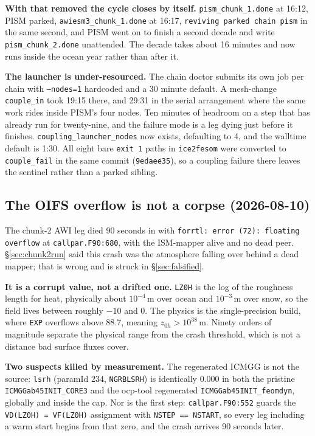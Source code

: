\documentclass[11pt,a4paper]{article}
\newcommand{\code}[1]{\texttt{\small #1}}
\begin{document}
\medskip\noindent
\textbf{With that removed the cycle closes by itself.} \code{pism\_chunk\_1.done} at 16:12, PISM
parked, \code{awiesm3\_chunk\_1.done} at 16:17, \code{reviving parked chain pism} in the same
second, and PISM went on to finish a second decade and write \code{pism\_chunk\_2.done} unattended.
The decade takes about 16 minutes and now runs inside the ocean year rather than after it.

\medskip\noindent
\textbf{The launcher is under-resourced.} The chain doctor submits its own job per chain with
\code{--nodes=1} hardcoded and a 30 minute default. A mesh-change \code{couple\_in} took 19:15
there, and 29:31 in the serial arrangement where the same work rides inside PISM's four nodes. Ten
minutes of headroom on a step that has already run for twenty-nine, and the failure mode is a leg
dying just before it finishes. \code{coupling\_launcher\_nodes} now exists, defaulting to 4, and
the walltime default is 1:30. All eight bare \code{exit 1} paths in \code{ice2fesom} were converted
to \code{couple\_fail} in the same commit (\code{9edaee35}), so a coupling failure there leaves the
sentinel rather than a parked sibling.

\subsection{The OIFS overflow is not a corpse (2026-08-10)}
\label{sec:lz0h}

The chunk-2 AWI leg died 90 seconds in with \code{forrtl: error (72): floating overflow} at
\code{callpar.F90:680}, with the ISM-mapper alive and no dead peer. \S\ref{sec:chunk2run} said this
crash was the atmosphere falling over behind a dead mapper; that is wrong and is struck in
\S\ref{sec:falsified}.

\medskip\noindent
\textbf{It is a corrupt value, not a drifted one.} \code{LZ0H} is the log of the roughness length
for heat, physically about $10^{-4}$\,m over ocean and $10^{-3}$\,m over snow, so the field lives
between roughly $-10$ and 0. The physics is the single-precision build, where \code{EXP} overflows
above 88.7, meaning $z_{0h} > 10^{38}$\,m. Ninety orders of magnitude separate the physical range
from the crash threshold, which is not a distance bad surface fluxes cover.

\medskip\noindent
\textbf{Two suspects killed by measurement.} The regenerated ICMGG is not the source: \code{lsrh}
(paramId 234, \code{NGRBLSRH}) is identically 0.000 in both the pristine
\code{ICMGGab45INIT\_CORE3} and the ocp-tool regenerated \code{ICMGGab45INIT\_feomdyn}, globally
and inside the cap. Nor is the first step: \code{callpar.F90:552} guards the
\code{VD(LZ0H) = VF(LZ0H)} assignment with \code{NSTEP == NSTART}, so every leg including a warm
start begins from that zero, and the crash arrives 90 seconds later.
\end{document}
